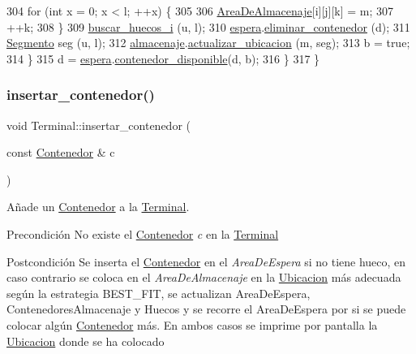 \begin{DoxyCode}
304             \textcolor{keywordflow}{for} (\textcolor{keywordtype}{int} x = 0; x < l; ++x) \{
305     
306                 \hyperlink{class_terminal_a50670862a5cdeb0504efd1c45b6416dc}{AreaDeAlmacenaje}[i][j][k] = m;
307                 ++k;
308             \}   
309             \hyperlink{class_terminal_a204fc08e3b6f13f75c525f282b023b19}{buscar\_huecos\_i} (u, l);
310             \hyperlink{class_terminal_ac9f71207d73c8d05a9d9d6c046f9f8c3}{espera}.\hyperlink{class_espera_a925d1944461d0e9bedef4d788283b98f}{eliminar\_contenedor} (d);
311             \hyperlink{class_segmento}{Segmento} seg (u, l);
312             \hyperlink{class_terminal_a1d87d7b16c4f460eee6f1ab73da90fd2}{almacenaje}.\hyperlink{class_almacenaje_a4035979df0e66a26d4b98d2b18d3d408}{actualizar\_ubicacion} (m, seg);
313             b = \textcolor{keyword}{true};
314         \}
315         d = \hyperlink{class_terminal_ac9f71207d73c8d05a9d9d6c046f9f8c3}{espera}.\hyperlink{class_espera_ab4205de26cc518d8130d6506796697ea}{contenedor\_disponible}(d, b);     
316     \}
317 \}
\end{DoxyCode}
\mbox{\label{class_terminal_a0448a45cc3dea91ab383c79246c9e50e}} 
\subsubsection{\texorpdfstring{insertar\+\_\+contenedor()}{insertar\_contenedor()}}
{\footnotesize\ttfamily void Terminal\+::insertar\+\_\+contenedor (\begin{DoxyParamCaption}\item[{const \hyperlink{class_contenedor}{Contenedor} \&}]{c }\end{DoxyParamCaption})}



Añade un \hyperlink{class_contenedor}{Contenedor} a la \hyperlink{class_terminal}{Terminal}. 

\begin{DoxyPrecond}{Precondición}
No existe el \hyperlink{class_contenedor}{Contenedor} {\itshape c} en la \hyperlink{class_terminal}{Terminal} 
\end{DoxyPrecond}
\begin{DoxyPostcond}{Postcondición}
Se inserta el \hyperlink{class_contenedor}{Contenedor} en el {\itshape Area\+De\+Espera} si no tiene hueco, en caso contrario se coloca en el {\itshape Area\+De\+Almacenaje} en la \hyperlink{class_ubicacion}{Ubicacion} más adecuada según la estrategia B\+E\+S\+T\+\_\+\+F\+IT, se actualizan Area\+De\+Espera, Contenedores\+Almacenaje y Huecos y se recorre el Area\+De\+Espera por si se puede colocar algún \hyperlink{class_contenedor}{Contenedor} más. En ambos casos se imprime por pantalla la \hyperlink{class_ubicacion}{Ubicacion} donde se ha colocado 
\end{DoxyPostcond}


